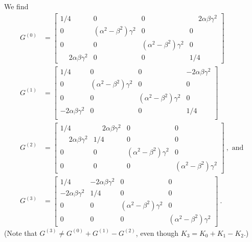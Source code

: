 \documentclass[prx,nofootinbib,onecolumn,showkeys,groupaddress,preprintnumbers,floatfix,
superscriptaddress]{revtex4-1}
\begin{document}
We find 
%
\begin{align}
G^{(0)} &= 
\begin{bmatrix}
    1/4 & 0 & 0 & \phantom{-}2\alpha \beta \gamma^2 \\
    0 & (\alpha^2 - \beta^2)\gamma^2 & 0 & 0 \\
    0 & 0 & (\alpha^2 - \beta^2)\gamma^2 & 0 \\
    \phantom{-} 2\alpha \beta \gamma^2 & 0 & 0 & 1/4 
\end{bmatrix} \\
G^{(1)} &= 
\begin{bmatrix}
    1/4 & 0 & 0 & -2\alpha \beta \gamma^2 \\
    0 & (\alpha^2 - \beta^2)\gamma^2  & 0 & 0 \\
    0 & 0 & (\alpha^2 - \beta^2)\gamma^2  & 0 \\
    -2\alpha \beta \gamma^2 & 0 & 0 & 1/4 \\
\end{bmatrix} \\
G^{(2)} &= 
\begin{bmatrix}
    1/4 & \phantom{-}2\alpha \beta \gamma^2 & 0 & 0 \\
    \phantom{-}2\alpha \beta \gamma^2 & 1/4 & 0 & 0 \\
    0 & 0 & (\alpha^2 - \beta^2)\gamma^2  & 0 \\
    0 & 0 & 0 & (\alpha^2 - \beta^2)\gamma^2 
\end{bmatrix} ~, \text{ and } \\
G^{(3)} 
&= 
\begin{bmatrix}
    1/4 & -2\alpha \beta \gamma^2 & 0 & 0 \\
    -2\alpha \beta \gamma^2 & 1/4 & 0 & 0 \\
    0 & 0 & (\alpha^2 - \beta^2)\gamma^2 & 0 \\
    0 & 0 & 0 & (\alpha^2 - \beta^2)\gamma^2  
\end{bmatrix} ~.
\end{align}
(Note that $G^{(3)} \neq G^{(0)} + G^{(1)} - G^{(2)} $, even though $K_3 = K_0 + K_1 - K_2$.)
\end{document}
